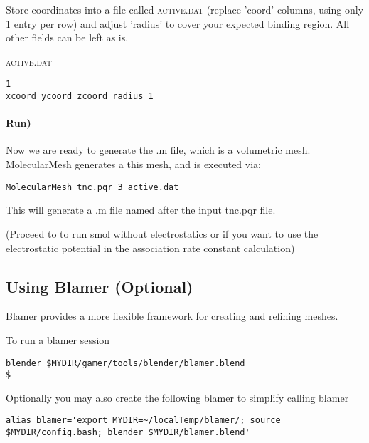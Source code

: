 \documentclass{article}
\begin{document}
Store coordinates into a file called \textsc{active.dat}  (replace 'coord' columns, using only 1 entry per row)  and adjust 'radius' to cover your expected binding region. All other fields can be left as is.

\textsc{active.dat}
\begin{verbatim}
1
xcoord ycoord zcoord radius 1
\end{verbatim}


\paragraph{Run)}
Now we are ready to generate the .m file, which is a volumetric mesh. 
MolecularMesh generates a this mesh, and is executed via:
\begin{verbatim}
MolecularMesh tnc.pqr 3 active.dat
\end{verbatim}

This will generate a .m file named after the input tnc.pqr file. 


(Proceed to  to run smol without electrostatics
 or  if you want to use the electrostatic
potential in the association rate constant calculation)



\subsection{Using Blamer (Optional)}
\label{blamer}
Blamer provides a more flexible framework for creating and refining meshes. 

To run a  blamer session
\begin{verbatim}
blender $MYDIR/gamer/tools/blender/blamer.blend
$
\end{verbatim}

Optionally you may also create the following blamer to simplify calling blamer
\begin{verbatim}
alias blamer='export MYDIR=~/localTemp/blamer/; source $MYDIR/config.bash; blender $MYDIR/blamer.blend'
\end{verbatim}
\end{document}
